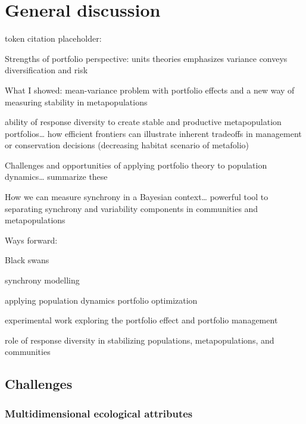 \chapter{General discussion}

token citation placeholder: \citep{anderson2014}

Strengths of portfolio perspective: units theories emphasizes variance conveys diversification and risk

What I showed: mean-variance problem with portfolio effects and a new way of measuring stability in metapopulations

ability of response diversity to create stable and productive metapopulation portfolios\ldots{} how efficient frontiers can illustrate inherent tradeoffs in management or conservation decisions (decreasing habitat scenario of metafolio)

Challenges and opportunities of applying portfolio theory to population dynamics\ldots{} summarize these

How we can measure synchrony in a Bayesian context\ldots{} powerful tool to separating synchrony and variability components in communities and metapopulations

Ways forward:

Black swans

synchrony modelling

applying population dynamics portfolio optimization

experimental work exploring the portfolio effect and portfolio management

role of response diversity in stabilizing populations, metapopulations, and communities

\section{Challenges}\label{challenges}

\subsection{Multidimensional ecological attributes}\label{multidimensional-ecological-attributes}

